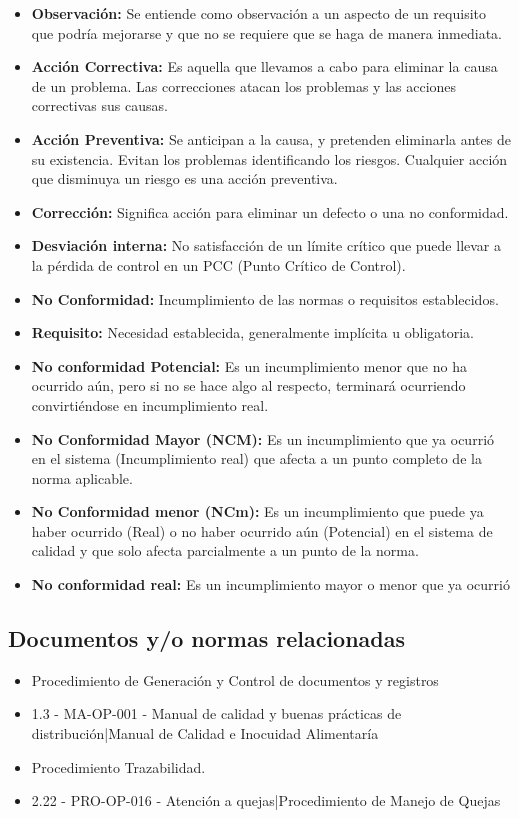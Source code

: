 \begin{itemize}
	\item \textbf{Observación:} Se entiende como observación a un aspecto de un requisito que podría mejorarse y que no se requiere que se haga de manera inmediata.
	\item \textbf{Acción Correctiva:} Es aquella que llevamos a cabo para eliminar la causa de un problema. Las correcciones atacan los problemas y las acciones correctivas sus causas.
	\item \textbf{Acción Preventiva:} Se anticipan a la causa, y pretenden eliminarla antes de su existencia. Evitan los problemas identificando los riesgos. Cualquier acción que disminuya un riesgo es una acción preventiva.
	\item \textbf{Corrección:} Significa acción para eliminar un defecto o una no conformidad.
	\item \textbf{Desviación interna:} No satisfacción de un límite crítico que puede llevar a la pérdida de control en un PCC (Punto Crítico de Control).
	\item \textbf{No Conformidad:} Incumplimiento de las normas o requisitos establecidos.
	\item \textbf{Requisito:} Necesidad establecida, generalmente implícita u obligatoria.
	\item \textbf{No conformidad Potencial:} Es un incumplimiento menor que no ha ocurrido aún, pero si no se hace algo al respecto, terminará ocurriendo convirtiéndose en incumplimiento real.
	\item \textbf{No Conformidad Mayor (NCM):} Es un incumplimiento que ya ocurrió en el sistema (Incumplimiento real) que afecta a un punto completo de la norma aplicable.
	\item \textbf{No Conformidad menor (NCm):} Es un incumplimiento que puede ya haber ocurrido (Real) o no haber ocurrido aún (Potencial) en el sistema de calidad y que solo afecta parcialmente a un punto de la norma.
	\item \textbf{No conformidad real:} Es un incumplimiento mayor o menor que ya ocurrió
\end{itemize}

\subsection{Documentos y/o normas relacionadas}

\begin{itemize}
	\item Procedimiento de Generación y Control de documentos y registros %
	\item 1.3 - MA-OP-001 - Manual de calidad y buenas prácticas de distribución|Manual de Calidad e Inocuidad Alimentaría
	\item Procedimiento Trazabilidad. %
	\item 2.22 - PRO-OP-016 - Atención a quejas|Procedimiento de Manejo de Quejas
\end{itemize}

